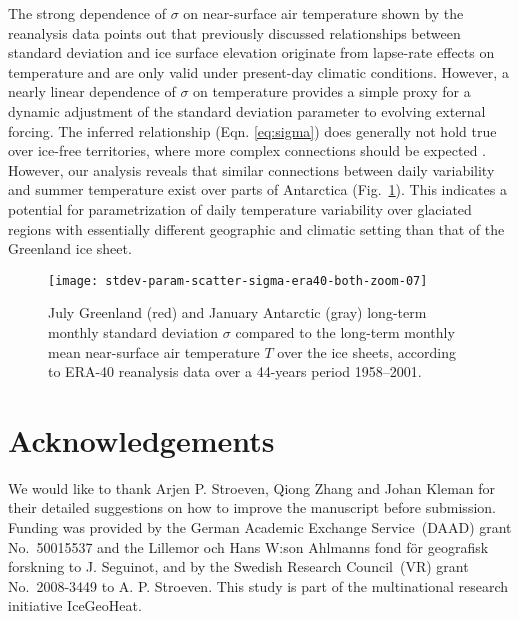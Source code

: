 \documentclass[review]{igs}
\begin{document}
The strong dependence of $\sigma$ on near-surface air temperature shown by the reanalysis data points out that previously discussed relationships between standard deviation and ice surface elevation \citep{fausto-etal-2009,fausto-etal-2011} originate from lapse-rate effects on temperature and are only valid under present-day climatic conditions. However, a nearly linear dependence of $\sigma$ on temperature provides a simple proxy for a dynamic adjustment of the standard deviation parameter to evolving external forcing. The inferred relationship (Eqn. \ref{eq:sigma}) does generally not hold true over ice-free territories, where more complex connections should be expected \citep{seguinot-2013}. However, our analysis reveals that similar connections between daily variability and summer temperature exist over parts of Antarctica (Fig.~\ref{fig:both}). This indicates a potential for parametrization of daily temperature variability over glaciated regions with essentially different geographic and climatic setting than that of the Greenland ice sheet.

\begin{figure}
    \centering\texttt{[image: stdev-param-scatter-sigma-era40-both-zoom-07]}
    \caption{July Greenland (red) and January Antarctic (gray) long-term monthly standard deviation $\sigma$ compared to the long-term monthly mean near-surface air temperature $T$ over the ice sheets, according to ERA-40 reanalysis data \citep{uppala-etal-2005} over a 44-years period 1958–2001.}
    \label{fig:both}
\end{figure}


\section{Acknowledgements}

We would like to thank Arjen P. Stroeven, Qiong Zhang and Johan Kleman for their detailed suggestions on how to improve the manuscript before submission. Funding was provided by the German Academic Exchange Service~(DAAD) grant No.~50015537 and the Lillemor och Hans W:son Ahlmanns fond för geografisk forskning to J. Seguinot, and by the Swedish Research Council~(VR) grant No.~2008-3449 to A. P. Stroeven. This study is part of the multinational research initiative IceGeoHeat.



\end{document}
